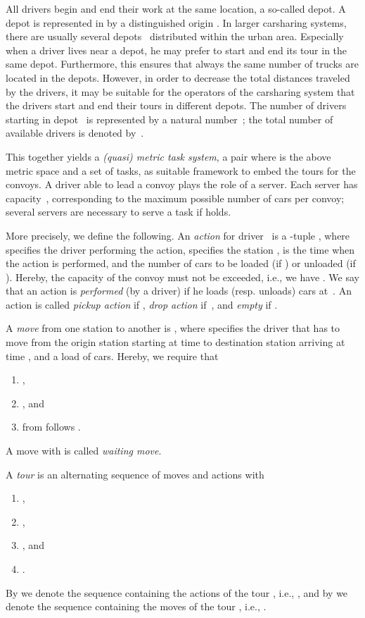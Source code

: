 \documentclass[english]{llncs}
\numberwithin{sublemma}{lemma}
\begin{document}
All drivers begin and end their work at the same location, a so-called depot.
A depot is represented in  by a distinguished origin .
In larger carsharing systems, there are usually several depots~ distributed within the urban area.
Especially when a driver lives near a depot, he may prefer to start and end its tour in the same depot.
Furthermore, this ensures that always the same number of trucks are located in the depots.
However, in order to decrease the total distances traveled by the drivers, it may be suitable for the operators of the carsharing system that the drivers start and end their tours in different depots.
The number of drivers starting in depot~ is represented by a natural number~; the total number of available drivers is denoted by~.


This together yields a \emph{(quasi) metric task system}, a pair  where  is the above metric space and  a set of tasks, as suitable framework to embed the tours for the convoys. 
A driver able to lead a convoy plays the role of a server.
Each server has capacity~, corresponding to the maximum possible number of cars per convoy; several servers are necessary to serve a task  if  holds.


More precisely, we define the following.
An \emph{action} for driver~ is a -tuple , where 
 specifies the driver  performing the action, 
 specifies the station , 
 is the time  when the action is performed, 
and  the number of cars  to be loaded (if ) or unloaded (if ). 
Hereby, the capacity of the convoy must not be exceeded, i.e., we have .
We say that an action is \emph{performed} (by a driver) if he loads (resp. unloads)  cars at~.
An action is called \emph{pickup action} if , \emph{drop action} if~, and \emph{empty} if .


A \emph{move} from one station to another is
, where
 specifies the driver  that has to move from the origin station  starting at time 
to destination station  arriving at time , and a load of  cars.
Hereby, we require that 
\begin{enumerate}
 \item\label{def: enum: move: 0} ,
\item\label{def: enum: move: 1} , and
 \item\label{def: enum: move: 2} from  follows .
\end{enumerate}
A move  with  is called \emph{waiting move}.



A \emph{tour} is an alternating sequence  of moves and actions with
\begin{enumerate}
 \item\label{def: enum: tour: 1} , 
 \item\label{def: enum: tour: 2} ,
 \item\label{def: enum: tour: 3} , and
 \item\label{def: enum: tour: 5} .
\end{enumerate}
By  we denote the sequence containing the actions of the tour , i.e., ,
and by  we denote the sequence containing the moves of the tour , i.e., .
\end{document}
